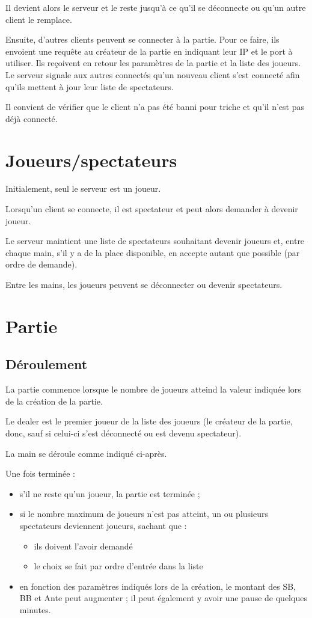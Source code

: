 Il devient alors le serveur et le reste jusqu'à ce qu'il se déconnecte ou qu'un autre client le remplace.

Ensuite, d'autres clients peuvent se connecter à la partie.
Pour ce faire, ils envoient une requête au créateur de la partie en indiquant leur IP et le port à utiliser.
Ils reçoivent en retour les paramètres de la partie et la liste des joueurs.
Le serveur signale aux autres connectés qu'un nouveau client s'est connecté afin qu'ils mettent à jour leur liste de spectateurs.

Il convient de vérifier que le client n'a pas été banni pour triche et qu'il n'est pas déjà connecté.

\section{Joueurs/spectateurs}

Initialement, seul le serveur est un joueur.

Lorsqu'un client se connecte, il est spectateur et peut alors demander à devenir joueur.

Le serveur maintient une liste de spectateurs souhaitant devenir joueurs et, entre chaque main, s'il y a de la place disponible, en accepte autant que possible (par ordre de demande).

Entre les mains, les joueurs peuvent se déconnecter ou devenir spectateurs.

\section{Partie}

\subsection{Déroulement}

La partie commence lorsque le nombre de joueurs atteind la valeur indiquée lors de la création de la partie.

Le dealer est le premier joueur de la liste des joueurs (le créateur de la partie, donc, sauf si celui-ci s'est déconnecté ou est devenu spectateur).

La main se déroule comme indiqué ci-après.

Une fois terminée :
\begin{itemize}
	\item s'il ne reste qu'un joueur, la partie est terminée ;
	\item si le nombre maximum de joueurs n'est pas atteint, un ou plusieurs spectateurs deviennent joueurs, sachant que :
	\begin{itemize}
		\item ils doivent l'avoir demandé
		\item le choix se fait par ordre d'entrée dans la liste
	\end{itemize}
	\item en fonction des paramètres indiqués lors de la création, le montant des SB, BB et Ante peut augmenter ; il peut également y avoir une pause de quelques minutes.
\end{itemize}


